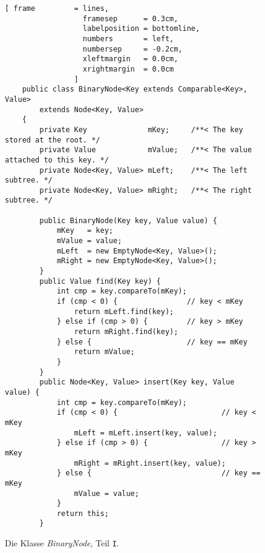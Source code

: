 \begin{figure}[!ht]
  \centering
\begin{Verbatim}[ frame         = lines, 
                  framesep      = 0.3cm, 
                  labelposition = bottomline,
                  numbers       = left,
                  numbersep     = -0.2cm,
                  xleftmargin   = 0.0cm,
                  xrightmargin  = 0.0cm
                ]
    public class BinaryNode<Key extends Comparable<Key>, Value> 
        extends Node<Key, Value>
    {
        private Key              mKey;     /**< The key stored at the root. */
        private Value            mValue;   /**< The value attached to this key. */
        private Node<Key, Value> mLeft;    /**< The left subtree. */
        private Node<Key, Value> mRight;   /**< The right subtree. */
    
        public BinaryNode(Key key, Value value) {
            mKey   = key;
            mValue = value;
            mLeft  = new EmptyNode<Key, Value>();
            mRight = new EmptyNode<Key, Value>();
        }        
        public Value find(Key key) {
            int cmp = key.compareTo(mKey);
            if (cmp < 0) {                // key < mKey
                return mLeft.find(key);
            } else if (cmp > 0) {         // key > mKey
                return mRight.find(key);
            } else {                      // key == mKey
                return mValue;
            }            
        }
        public Node<Key, Value> insert(Key key, Value value) {
            int cmp = key.compareTo(mKey);
            if (cmp < 0) {                        // key < mKey
                mLeft = mLeft.insert(key, value);
            } else if (cmp > 0) {                 // key > mKey
                mRight = mRight.insert(key, value);
            } else {                              // key == mKey
                mValue = value;
            }            
            return this;
        }
\end{Verbatim}
\vspace*{-0.3cm}
  \caption{Die Klasse \textsl{BinaryNode}, Teil \texttt{I}.}
  \label{fig:BinaryNode-I.java}
\end{figure}


